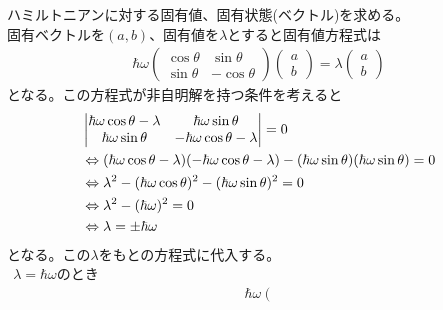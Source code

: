\documentclass{jsarticle}  %
\numberwithin{equation}{section} %
\numberwithin{figure}{section}
\begin{document}
    \begin{proofline}
        ハミルトニアンに対する固有値、固有状態(ベクトル)を求める。\\
        固有ベクトルを$(a,b)$、固有値を$\lambda$とすると固有値方程式は
        \begin{align}
            \hbar \omega 
            \left(
            \begin{matrix}
                \cos \theta&\sin \theta\\
                \sin \theta&-\cos \theta
            \end{matrix}
            \right)
            \left(
            \begin{matrix}
                a\\
                b
            \end{matrix}
            \right)
            = \lambda 
            \left(
            \begin{matrix}
                a\\
                b
            \end{matrix}
            \right)
        \end{align}
        となる。この方程式が非自明解を持つ条件を考えると
        \begin{align}
            &\left|
            \begin{matrix}
                \hbar \omega \cos \theta - \lambda&\hbar \omega \sin \theta\\
                \hbar \omega \sin \theta&-\hbar \omega \cos \theta - \lambda
            \end{matrix}
            \right| = 0 \notag \\
            &\Leftrightarrow (\hbar \omega \cos \theta - \lambda)(-\hbar \omega \cos \theta - \lambda)-(\hbar \omega \sin \theta)(\hbar \omega \sin \theta)=0 \notag \\
            &\Leftrightarrow \lambda^2 - (\hbar \omega \cos \theta)^2 - (\hbar \omega \sin \theta)^2 = 0 \notag \\
            &\Leftrightarrow \lambda^2 - (\hbar \omega)^2 = 0 \notag  \\
            &\Leftrightarrow \lambda = \pm \hbar \omega 
        \end{align}
        となる。この$\lambda$をもとの方程式に代入する。\\
        $\ \ $$\lambda = \hbar \omega$のとき
        \begin{align}
            &\hbar \omega 
            \left(
            \begin{matrix}

\end{matrix}
\end{align}$$
\end{proofline}
\end{document}
